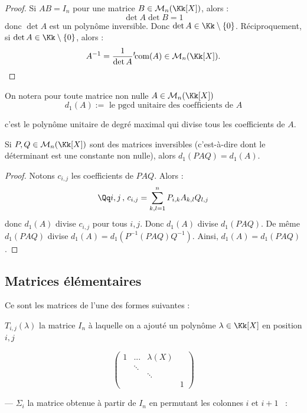 \documentclass[class=report,crop=false]{standalone}
\begin{document}
\begin{proof}
Si $AB = I_n$ pour une matrice $B \in \mathcal{M}_n(\Kk[X])$, alors :
\[\det A \det B = 1\]
donc $\det A$ est un polynôme inversible. Donc $\det A \in \Kk\setminus \{0\}$. Réciproquement, si $\det A \in \Kk\setminus \{0\}$, alors :
\[A^{-1} = \frac{1}{\det A } {}^t\! \text{com}(A) \in \mathcal{M}_n(\Kk[X]) .\]
\end{proof}

\begin{definition}
On notera pour toute matrice non nulle  $A \in \mathcal{M}_n(\Kk[X])$ 
\[d_1(A) := \mbox{ le pgcd unitaire des coefficients de $A$}\]

c'est le polynôme unitaire de degré maximal qui divise tous les coefficients de $A$.
\end{definition}

\begin{proposition}
Si $P,Q \in \mathcal{M}_n(\Kk[X])$ sont des matrices inversibles (c'est-à-dire dont le déterminant est une constante non nulle), alors $d_1(PAQ) = d_1(A)$. 
\end{proposition}

\begin{proof}
Notons $c_{i,j}$ les coefficients de $PAQ$. Alors :
\[\Qq i,j\,,\, c_{i,j} = \sum_{k,l=1}^nP_{i,k}A_{k,l}Q_{l,j}\]
donc $d_1(A)$ divise $c_{i,j}$ pour tous $i,j$. Donc $d_1(A)$ divise $d_1(PAQ)$. De même $d_1(PAQ)$ divise $d_1(A)=d_1(P^{-1} (PAQ) Q^{-1})$. Ainsi, $d_1(A) = d_1(PAQ)$.
\end{proof}

\subsection{Matrices élémentaires}

Ce sont les  matrices de l'une des  formes suivantes :

 $T_{i,j}(\lambda)$ \og la matrice $I_n$ à laquelle on a ajouté un polynôme $\lambda \in \Kk[X]$ en position $i,j$ \fg\ 

\[\left(
\begin{array}{cccc}
1 & ...&\lambda(X) &\\
&\ddots &&\\
&&\ddots&\\
&&&1
\end{array}
\right)
\]

--- $\Sigma_{i}$ \og la matrice obtenue à partir de $I_n$ en permutant les colonnes $i$ et $i+1$ \fg\ :
\end{document}
